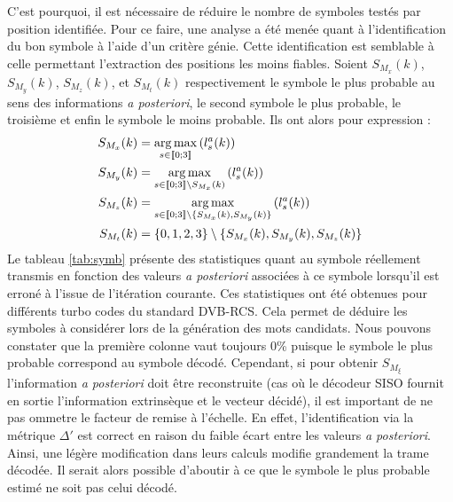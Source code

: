 C'est pourquoi, il est nécessaire de réduire le nombre de symboles testés par position identifiée. Pour ce faire, une 
analyse a été menée quant à l'identification du bon symbole à l'aide d'un critère génie. Cette identification est semblable 
à celle permettant l'extraction des positions les moins fiables.
Soient $S_{M_x}(k)$, $S_{M_y}(k)$, $S_{M_z}(k)$, et $S_{M_t}(k)$ respectivement le symbole le plus probable au sens 
des informations \textit{a posteriori}, le second symbole le plus probable, le troisième et enfin le symbole le moins 
probable. Ils ont alors pour expression :
\begin{align*}
S_{M_x}(k) &= \operatorname*{arg\,max}\limits_{s\in\llbracket0;3\rrbracket}\left(l^a_s(k)\right) \\
S_{M_y}(k) &= \operatorname*{arg\,max}\limits_{s\in\llbracket0;3\rrbracket\setminus{S_{M_x}(k)}}\left(l^a_s(k)\right)\\
S_{M_z}(k) &= \operatorname*{arg\,max}\limits_{s\in\llbracket0;3\rrbracket\setminus{\{S_{M_x}(k)}, S_{M_y}(k)\}}\left(l^a_s(k)\right)\\
S_{M_t}(k) &= \{0,1,2,3\}\setminus{\{S_{M_x}(k), S_{M_y}(k), S_{M_z}(k)\}}
\end{align*}
Le tableau \ref{tab:symb} présente des statistiques quant au symbole réellement transmis en fonction des valeurs 
\textit{a posteriori} associées à ce symbole lorsqu'il est erroné à l'issue de l'itération courante. 
Ces statistiques ont été obtenues pour différents turbo codes du standard DVB-RCS. 
Cela permet de déduire les symboles à considérer lors de la génération des 
mots candidats. Nous pouvons constater que la première colonne vaut toujours 0\% puisque le symbole le plus probable correspond au
symbole décodé. 
Cependant, si pour obtenir $S_{M_\xi}$ l'information \textit{a posteriori} doit être reconstruite 
(cas où le décodeur SISO fournit en sortie l'information extrinsèque et le vecteur décidé), il est important de ne pas 
ommetre le facteur de remise à l'échelle. En effet, l'identification via la métrique $\Delta'$ est correct
en raison du faible écart entre les valeurs \textit{a posteriori}. Ainsi, une légère modification dans leurs calculs 
modifie grandement la trame décodée. Il serait alors possible d'aboutir à ce que le symbole le plus probable estimé ne
soit pas celui décodé.
